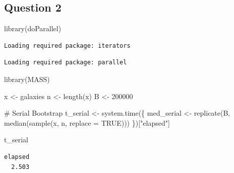 \documentclass[
  letterpaper,
  DIV=11,
  numbers=noendperiod]{scrreprt}
\newenvironment{Shaded}{\begin{snugshade}}{\end{snugshade}}
\newcommand{\AttributeTok}[1]{\textcolor[rgb]{0.40,0.45,0.13}{#1}}
\newcommand{\CommentTok}[1]{\textcolor[rgb]{0.37,0.37,0.37}{#1}}
\newcommand{\ConstantTok}[1]{\textcolor[rgb]{0.56,0.35,0.01}{#1}}
\newcommand{\DecValTok}[1]{\textcolor[rgb]{0.68,0.00,0.00}{#1}}
\newcommand{\FunctionTok}[1]{\textcolor[rgb]{0.28,0.35,0.67}{#1}}
\newcommand{\NormalTok}[1]{\textcolor[rgb]{0.00,0.23,0.31}{#1}}
\newcommand{\OtherTok}[1]{\textcolor[rgb]{0.00,0.23,0.31}{#1}}
\newcommand{\StringTok}[1]{\textcolor[rgb]{0.13,0.47,0.30}{#1}}
\begin{document}
\subsection{Question 2}\label{question-2}

\begin{Shaded}
\begin{Highlighting}[]
\FunctionTok{library}\NormalTok{(doParallel)}
\end{Highlighting}
\end{Shaded}

\begin{verbatim}
Loading required package: iterators
\end{verbatim}

\begin{verbatim}
Loading required package: parallel
\end{verbatim}

\begin{Shaded}
\begin{Highlighting}[]
\FunctionTok{library}\NormalTok{(MASS)}

\NormalTok{x }\OtherTok{\textless{}{-}}\NormalTok{ galaxies}
\NormalTok{n }\OtherTok{\textless{}{-}} \FunctionTok{length}\NormalTok{(x)}
\NormalTok{B }\OtherTok{\textless{}{-}} \DecValTok{200000}

\CommentTok{\# Serial Bootstrap}
\NormalTok{t\_serial }\OtherTok{\textless{}{-}} \FunctionTok{system.time}\NormalTok{(\{}
\NormalTok{  med\_serial }\OtherTok{\textless{}{-}} \FunctionTok{replicate}\NormalTok{(B, }\FunctionTok{median}\NormalTok{(}\FunctionTok{sample}\NormalTok{(x, n, }\AttributeTok{replace =} \ConstantTok{TRUE}\NormalTok{)))}
\NormalTok{\})[}\StringTok{"elapsed"}\NormalTok{]}

\NormalTok{t\_serial}
\end{Highlighting}
\end{Shaded}

\begin{verbatim}
elapsed 
  2.503 
\end{verbatim}
\end{document}

